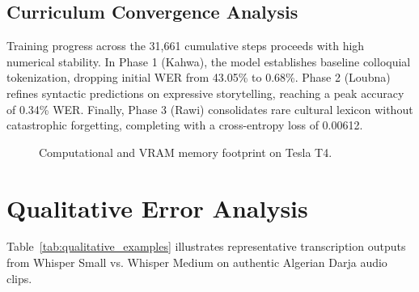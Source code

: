 \documentclass[11pt,a4paper]{article}
\begin{document}
\subsection{Curriculum Convergence Analysis}
Training progress across the 31,661 cumulative steps proceeds with high numerical stability. In Phase 1 (Kahwa), the model establishes baseline colloquial tokenization, dropping initial WER from 43.05\% to 0.68\%. Phase 2 (Loubna) refines syntactic predictions on expressive storytelling, reaching a peak accuracy of 0.34\% WER. Finally, Phase 3 (Rawi) consolidates rare cultural lexicon without catastrophic forgetting, completing with a cross-entropy loss of 0.00612.

\begin{figure}[t]
\centering
\begin{minipage}{0.48\textwidth}
\centering
{}
\caption{Validation WER convergence across sequential curriculum phases.}
\label{fig:loss_trajectory}
\end{minipage}
\hfill
\begin{minipage}{0.48\textwidth}
\centering
{}
\caption{Computational and VRAM memory footprint on Tesla T4.}
\label{fig:memory_profile}
\end{minipage}
\end{figure}

\section{Qualitative Error Analysis}
\label{sec:qualitative}

Table~\ref{tab:qualitative_examples} illustrates representative transcription outputs from Whisper Small vs. Whisper Medium on authentic Algerian Darja audio clips.
\end{document}
